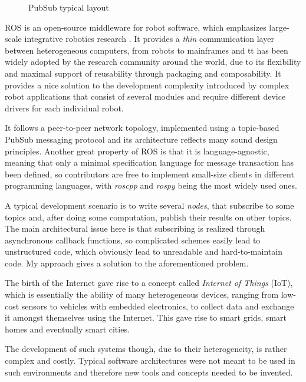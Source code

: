 \documentclass{dithesis}
\begin{document}
\begin{figure}[h!] 
	\centering
  	 
  	\caption{PubSub typical layout}
\end{figure}


ROS is an open-source middleware for robot software, which emphasizes large-scale integrative robotics research \cite{ROS}. It provides a \textit{thin} communication layer between heterogeneous computers, from robots to mainframes and tt has been widely adopted by the research community around the world, due to its flexibility and maximal support of reusability through packaging and composability. It provides a nice solution to the development complexity introduced by complex robot applications that consist of several modules and require different device drivers for each individual robot. 

It follows a peer-to-peer network topology, implemented using a topic-based PubSub messaging protocol and its architecture reflects many sound design principles. Another great property of ROS is that it is language-agnostic, meaning that only a minimal specification language for message transaction has been defined, so contributors are free to implement small-size clients in different programming languages, with \textit{roscpp} and \textit{rospy} being the most widely used ones.

A typical development scenario is to write several \textit{nodes}, that subscribe to some topics and, after doing some computation, publish their results on other topics. The main architectural issue here is that subscribing is realized through asynchronous callback functions, so complicated schemes easily lead to unstructured code, which obviously lead to unreadable and hard-to-maintain code. My approach gives a solution to the aforementioned problem.
 

The birth of the Internet gave rise to a concept called \textit{Internet of Things} (IoT), which is essentially the ability of many heterogeneous devices, ranging from low-cost sensors to vehicles with embedded electronics, to collect data and exchange it amongst themselves using the Internet. This gave rise to smart grids, smart homes and eventually smart cities. 

The development of such systems though, due to their heterogeneity, is rather complex and costly. Typical software architectures were not meant to be used in such environments and therefore new tools and concepts needed to be invented. 
\end{document}
